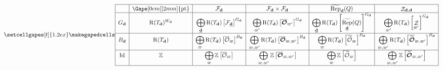 \documentclass[border={7pt 0pt 160pt 0pt},varwidth]{standalone}
\DeclareMathOperator{\Id}{\operatorname{Id}}
\DeclareMathOperator{\RRep}{\widetilde{\operatorname{Rep}}}
\DeclareMathOperator{\pt}{\operatorname{pt}}
\DeclareMathOperator{\Rpt}{\operatorname{R}}
\DeclareMathOperator{\St}{\mathcal{Z}}
\newcommand{\dimvec}[1]{\mathbf{#1}}
\newcommand{\ftdimvec}[1]{\underline{\dimvec{#1}}}
\newcommand{\ww}{\varpi}
\newcommand{\Wd}{W_{\dimvec{d}}}
\newcommand{\Ocell}{\mathcal{O}}
\newcommand{\OOcell}{\boldsymbol{\mathcal{O}}}
\newcommand{\preimage}[1]{\widetilde{#1}}
\begin{document}
\begin{table}[]
\[
 \setcellgapes[t]{1.2ex}\makegapedcells
\centering
\begin{array}{|c|c|c|c|c|c|}
\hline
      & \Gape[0cm][2mm]{\pt}         & \mathcal{F}_{\dimvec{d}}                                                    & \mathcal{F}_{\dimvec{d}} \times \mathcal{F}_{\dimvec{d}}                &\RRep_{\dimvec{d}}(Q)&   \St_{\dimvec{d},\dimvec{d}}                      \\
       \hline
G_{\dimvec{d}} & \Rpt(T_{\dimvec{d}})^{\Wd} & \displaystyle\bigoplus_{\ftdimvec{d}}\Rpt(T_{\dimvec{d}})  \left[ \mathcal{F}_{\ftdimvec{d}} \right]^{G_{\dimvec{d}}}                                                      & \displaystyle\bigoplus_{\ww'} \Rpt(T_{\dimvec{d}})  \left[ \overline{\OOcell}_{\ww'} \right]^{G_{\dimvec{d}}}
& \displaystyle\bigoplus_{\ftdimvec{d}}\Rpt(T_{\dimvec{d}})    \left[ \RRep_{\ftdimvec{d}}(Q) \right]^{G_{\dimvec{d}}}                                                                             & \displaystyle\bigoplus_{\ww'} \Rpt(T_{\dimvec{d}})  \left[ \St_{\ww'} \right]^{G_{\dimvec{d}}} \\ \hline
{B_{\dimvec{d}}}     & \Rpt(T_{\dimvec{d}})     & \displaystyle\bigoplus_{\ww} \Rpt(T_{\dimvec{d}}) \left[ \overline{\Ocell}_{\ww} \right]^{B_{\dimvec{d}}}  & \displaystyle\bigoplus_{\ww,\ww'} \Rpt(T_{\dimvec{d}}) \left[ \overline{\OOcell}_{\ww,\ww'} \right]^{B_{\dimvec{d}}}
& \displaystyle\bigoplus_{\ww} \Rpt(T_{\dimvec{d}}) \left[ \overline{\preimage{\Ocell}}_{\ww} \right]^{B_{\dimvec{d}}}  & \displaystyle\bigoplus_{\ww,\ww'} \Rpt(T_{\dimvec{d}}) \left[ \overline{\preimage{\OOcell}}_{\ww,\ww'} \right]^{B_{\dimvec{d}}}    \\ \hline
\Id   & \mathbb{Z}  & \displaystyle\bigoplus_{\ww} \mathbb{Z} \left[ \overline{\Ocell}_{\ww} \right] & \displaystyle\bigoplus_{\ww,\ww'} \mathbb{Z} \left[ \overline{\OOcell}_{\ww,\ww'} \right]
& \displaystyle\bigoplus_{\ww} \mathbb{Z} \left[ \overline{\preimage{\Ocell}}_{\ww} \right] & \displaystyle\bigoplus_{\ww,\ww'} \mathbb{Z} \left[ \overline{\preimage{\OOcell}}_{\ww,\ww'} \right]   \\ \hline
\end{array}
\]
\end{table}
\end{document}

